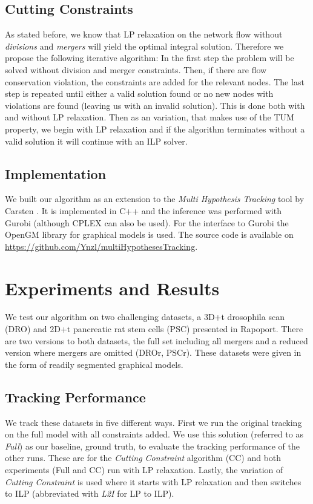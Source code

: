 \documentclass[10pt,twocolumn,letterpaper]{article}
\begin{document}
\subsection{Cutting Constraints}

As stated before, we know that LP relaxation on the network flow without \textit{divisions} and \textit{mergers} will yield the optimal integral solution. Therefore we propose the following iterative algorithm: In the first step the problem will be solved without division and merger constraints. Then, if there are flow conservation violation, the constraints are added for the relevant nodes. The last step is repeated until either a valid solution found or no new nodes with violations are found (leaving us with an invalid solution). This is done both with and without LP relaxation. Then as an variation, that makes use of the TUM property, we begin with LP relaxation and if the algorithm terminates without a valid solution it will continue with an ILP solver.


\subsection{Implementation}

We built our algorithm as an extension to the \textit{Multi Hypothesis Tracking} tool by Carsten \cite{haubold2017phd}. It is implemented in C++ and the inference was performed with Gurobi (although CPLEX can also be used). For the interface to Gurobi the OpenGM library \cite{opengm-library} for graphical models is used. The source code is available on \url{https://github.com/Ynzl/multiHypothesesTracking}.

\section{Experiments and Results}

We test our algorithm on two challenging datasets, a 3D+t drosophila scan (DRO) and 2D+t pancreatic rat stem cells (PSC) presented in Rapoport. There are two versions to both datasets, the full set including all mergers and a reduced version where mergers are omitted (DROr, PSCr). These datasets were given in the form of readily segmented graphical models.

\subsection{Tracking Performance}

We track these datasets in five different ways. First we run the original tracking on the full model with all constraints added. We use this solution (referred to as \textit{Full}) as our baseline, \ie ground truth, to evaluate the tracking performance of the other runs. These are for the \textit{Cutting Constraint} algorithm (CC) and both experiments (Full and CC) run with LP relaxation. Lastly, the variation of \textit{Cutting Constraint} is used where it starts with LP relaxation and then switches to ILP (abbreviated with \textit{L2I} for LP to ILP).
\end{document}
